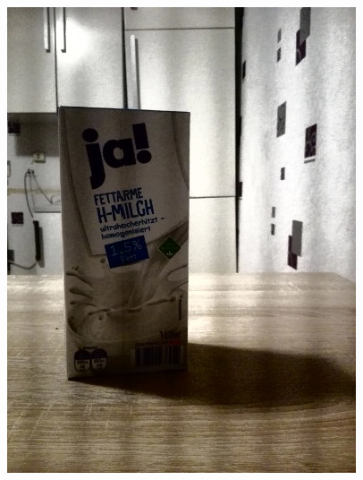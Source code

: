 \begin{appendices}
\begin{figure}[htb]
\begin{minipage}{0.19\textwidth}
\includegraphics[width=\textwidth]{images/anomalien/HA/image41.jpg}
\end{minipage}
\begin{minipage}{0.19\textwidth}

\end{minipage}
\end{figure}
\end{appendices}
